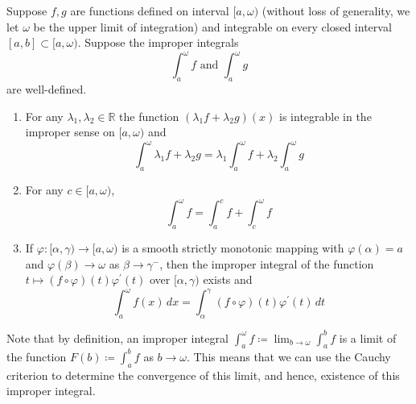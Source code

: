   \begin{lemma}
    \label{thm:properties-of-the-improper-integral}
    Suppose $f, g$ are functions defined on interval $[a, \omega)$ (without loss of generality, we let $\omega$ be the upper limit of integration) and integrable on every closed interval $[a, b] \subset [a, \omega)$. Suppose the improper integrals 
    \begin{equation}
      \int_a^\omega f \text{ and } \int_a^\omega g
    \end{equation}
    are well-defined. 
    \begin{enumerate}
      \item For any $\lambda_1, \lambda_2 \in \mathbb{R}$ the function $(\lambda_1 f + \lambda_2 g)(x)$ is integrable in the improper sense on $[a, \omega)$ and
        \begin{equation}
          \int_a^\omega \lambda_1 f + \lambda_2 g = \lambda_1 \int_a^\omega f + \lambda_2 \int_a^\omega g
        \end{equation}

      \item For any $c \in [a, \omega)$, 
        \begin{equation}
          \int_a^\omega f = \int_a^c f + \int_c^\omega f
        \end{equation}

      \item If $\varphi: [\alpha, \gamma) \to [a, \omega)$ is a smooth strictly monotonic mapping with $\varphi(\alpha) = a$ and $\varphi(\beta) \rightarrow \omega$ as $\beta \rightarrow \gamma^-$, then the improper integral of the function $t \mapsto (f \circ \varphi)(t) \varphi^\prime (t)$ over $[\alpha, \gamma)$ exists and 
        \begin{equation}
          \int_a^\omega f(x)\,dx = \int_\alpha^\gamma (f \circ \varphi)(t) \varphi^\prime (t)\,dt
        \end{equation}
    \end{enumerate}
  \end{lemma}

  Note that by definition, an improper integral $\int_a^\omega f \coloneqq \lim_{b \rightarrow \omega} \int_a^b f$ is a limit of the function $F(b) \coloneqq \int_a^b f$ as $b \rightarrow \omega$. This means that we can use the Cauchy criterion to determine the convergence of this limit, and hence, existence of this improper integral. 

